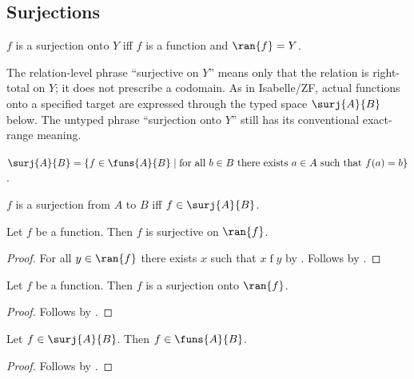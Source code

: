 \subsection{Surjections}

\begin{definition}\label{surjection}
    $f$ is a surjection onto $Y$ iff
        $f$ is a function and $\ran{f}=Y$.
\end{definition}

The relation-level phrase ``surjective on $Y$'' means only that the relation
is right-total on $Y$; it does not prescribe a codomain.  As in Isabelle/ZF,
actual functions onto a specified target are expressed through the typed
space $\surj{A}{B}$ below.  The untyped phrase ``surjection onto $Y$'' still
has its conventional exact-range meaning.

\begin{definition}\label{surj}
    $\surj{A}{B} = \{f\in\funs{A}{B}\mid \text{for all $b\in B$ there exists $a\in A$ such that $f(a) = b$}\}$.
\end{definition}

\begin{abbreviation}\label{surjection_from_to}
    $f$ is a surjection from $A$ to $B$ iff $f\in\surj{A}{B}$.
\end{abbreviation}

\begin{lemma}\label{function_surjective_on_ran}
    Let $f$ be a function.
    Then $f$ is surjective on $\ran{f}$.
\end{lemma}
\begin{proof}
    For all $y\in\ran{f}$ there exists $x$ such that $x\mathrel{f}y$
        by .
    Follows by .
\end{proof}

\begin{lemma}\label{surjection_ran}
    Let $f$ be a function.
    Then $f$ is a surjection onto $\ran{f}$.
\end{lemma}
\begin{proof}
    Follows by .
\end{proof}

\begin{lemma}\label{surj_to_fun}
    Let $f\in\surj{A}{B}$.
    Then $f\in\funs{A}{B}$.
\end{lemma}
\begin{proof}
    Follows by .
\end{proof}

